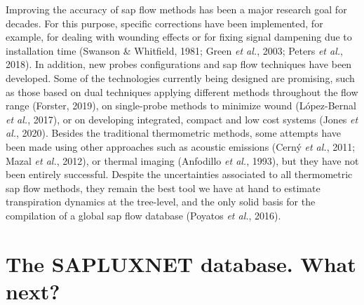 \documentclass[11pt,twoside]{reedthesis}
\begin{document}
Improving the accuracy of sap flow methods has been a major research
goal for decades. For this purpose, specific corrections have been
implemented, for example, for dealing with wounding effects or for
fixing signal dampening due to installation time (Swanson \& Whitfield,
1981; Green \emph{et al.}, 2003; Peters \emph{et al.}, 2018). In
addition, new probes configurations and sap flow techniques have been
developed. Some of the technologies currently being designed are
promising, such as those based on dual techniques applying different
methods throughout the flow range (Forster, 2019), on single-probe
methods to minimize wound (López-Bernal \emph{et al.}, 2017), or on
developing integrated, compact and low cost systems (Jones \emph{et
al.}, 2020). Besides the traditional thermometric methods, some attempts
have been made using other approaches such as acoustic emissions (Cerný
\emph{et al.}, 2011; Mazal \emph{et al.}, 2012), or thermal imaging
(Anfodillo \emph{et al.}, 1993), but they have not been entirely
successful. Despite the uncertainties associated to all thermometric sap
flow methods, they remain the best tool we have at hand to estimate
transpiration dynamics at the tree-level, and the only solid basis for
the compilation of a global sap flow database (Poyatos \emph{et al.},
2016).\par

\section{The SAPLUXNET database. What
next?}\label{the-sapluxnet-database.-what-next}
\end{document}
